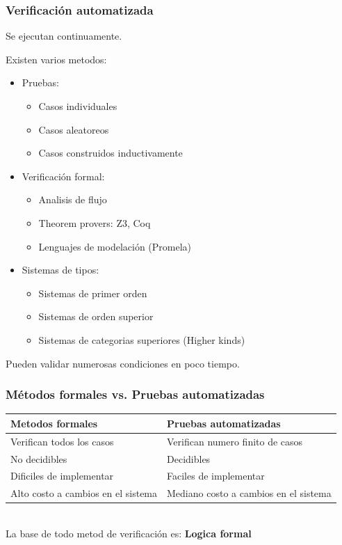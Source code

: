 \documentclass{beamer}
\begin{document}
\begin{frame}
    \frametitle{Verificaci\'on automatizada}
    \begin{itemize}
        \item{Se ejecutan continuamente.}
        \item{Existen varios metodos:
            \begin{itemize}
                \item{Pruebas:
                    \begin{itemize}
                        \item{Casos individuales}
                        \item{Casos aleatoreos}
                        \item{Casos construidos inductivamente}
                    \end{itemize}
                }
                \item{Verificaci\'on formal:
                    \begin{itemize}
                        \item{Analisis de flujo}
                        \item{Theorem provers: Z3, Coq}
                        \item{Lenguajes de modelaci\'on (Promela)}
                    \end{itemize}
                }
                \item{Sistemas de tipos:
                    \begin{itemize}
                        \item{Sistemas de primer orden}
                        \item{Sistemas de orden superior}
                        \item{Sistemas de categorias superiores (Higher kinds)}
                    \end{itemize}
                }
            \end{itemize}
        \item{Pueden validar numerosas condiciones en poco tiempo.}
        }
    \end{itemize}
\end{frame}

\begin{frame}
    \frametitle{M\'etodos formales vs. Pruebas automatizadas}
    \begin{tabular}{|p{5cm}|p{5cm}|}
    \hline
    {\bf Metodos formales} & {\bf Pruebas automatizadas} \\
    \hline
    Verifican todos los casos & Verifican numero finito de casos \\
    \hline
    No decidibles & Decidibles \\
    \hline
    Dificiles de implementar & Faciles de implementar \\
    \hline
    Alto costo a cambios en el sistema & Mediano costo a cambios en el sistema \\
    \hline
    \end{tabular}
\\La base de todo metod de verificaci\'on es: {\bf Logica formal}
\end{frame}
\end{document}
